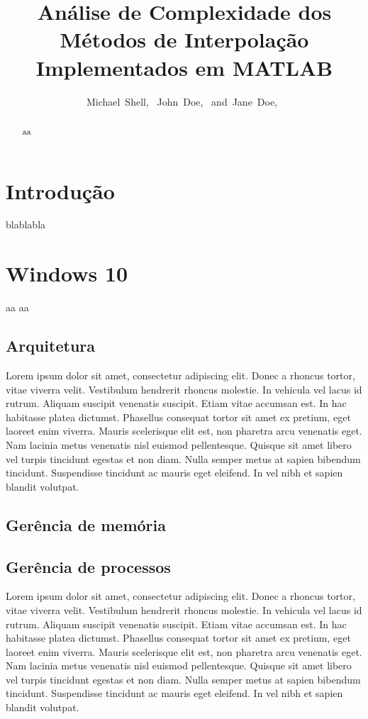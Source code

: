 \documentclass[journal]{IEEEtran}
\title{Análise de Complexidade dos Métodos de Interpolação Implementados em MATLAB}
\author{Michael~Shell,~\IEEEmembership{Member,~IEEE,}
        John~Doe,~\IEEEmembership{Fellow,~OSA,}
        and~Jane~Doe,~\IEEEmembership{Life~Fellow,~IEEE}}%
\begin{document}
 

\maketitle
     
\begin{abstract} 
	aa
\end{abstract}

\section{Introdução}
	blablabla
	
\section{Windows 10}
	aa aa
\subsection{Arquitetura}
Lorem ipsum dolor sit amet, consectetur adipiscing elit. Donec a rhoncus tortor, vitae viverra velit. Vestibulum hendrerit rhoncus molestie. In vehicula vel lacus id rutrum. Aliquam suscipit venenatis suscipit. Etiam vitae accumsan est. In hac habitasse platea dictumst. Phasellus consequat tortor sit amet ex pretium, eget laoreet enim viverra. Mauris scelerisque elit est, non pharetra arcu venenatis eget. Nam lacinia metus venenatis nisl euismod pellentesque. Quisque sit amet libero vel turpis tincidunt egestas et non diam. Nulla semper metus at sapien bibendum tincidunt. Suspendisse tincidunt ac mauris eget eleifend. In vel nibh et sapien blandit volutpat. 

\subsection{Gerência de memória}
  
\subsection{Gerência de processos}
	Lorem ipsum dolor sit amet, consectetur adipiscing elit. Donec a rhoncus tortor, vitae viverra velit. Vestibulum hendrerit rhoncus molestie. In vehicula vel lacus id rutrum. Aliquam suscipit venenatis suscipit. Etiam vitae accumsan est. In hac habitasse platea dictumst. Phasellus consequat tortor sit amet ex pretium, eget laoreet enim viverra. Mauris scelerisque elit est, non pharetra arcu venenatis eget. Nam lacinia metus venenatis nisl euismod pellentesque. Quisque sit amet libero vel turpis tincidunt egestas et non diam. Nulla semper metus at sapien bibendum tincidunt. Suspendisse tincidunt ac mauris eget eleifend. In vel nibh et sapien blandit volutpat. 
\end{document}

